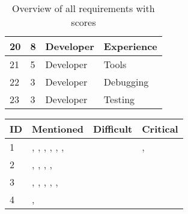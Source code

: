 \begin{table}[]
\begin{tabular}{|l|l|l|l|}
        20                & 8  & Developer   & Experience             \\ \hline
        21                & 5  & Developer   & Tools                  \\ \hline
        22                & 3  & Developer   & Debugging              \\ \hline
        23                & 3  & Developer   & Testing                \\ \hline
    \end{tabular}
    \caption{Overview of all requirements with scores}
    \label{tbl:adx_requirements_scores}
\end{table}




\begin{table}[]
    \begin{tabular}{|l|l|l|l|}
        \hline
        \textbf{\ac{ID}}   &
        \textbf{Mentioned} &
        \textbf{Difficult} &
        \textbf{Critical}
        \\ \hline
        1                  & \cite{Dornenburg.2019}, \cite{Grijzen.2019}, \cite{Vogel.2020.Huber}, \cite{Jackson.2019}, \cite{Leitner.2020}, \cite{Laug.2018}, \cite{Vogel.2020.Steyer}     &                                                                                                              & \cite{Vogel.2020.Jovanovic}, \cite{Vogel.2020.Rehm}                           \\ \hline
        2                  & \cite{Dornenburg.2019}, \cite{Grijzen.2019}, \cite{Leitner.2020}, \cite{Vogel.2020.Mezzalira}, \cite{Vogel.2020.Olleck}                                        &                                                                                                              & \cite{Vogel.2020.Rehm}                                                        \\ \hline
        3                  & \cite{Dornenburg.2019}, \cite{Grijzen.2019}, \cite{Vogel.2020.Huber}, \cite{Laug.2018}, \cite{Vogel.2020.Rehm}, \cite{Vogel.2020.Steyer}                       & \cite{Vogel.2020.Mezzalira}                                                                                  &                                                                               \\ \hline
        4                  & \cite{Grijzen.2019}, \cite{Vogel.2020.Rehm}                                                                                                                    &                                                                                                              & \cite{Vogel.2020.Jovanovic}                                                   \\ \hline

\end{tabular}
\end{table}
